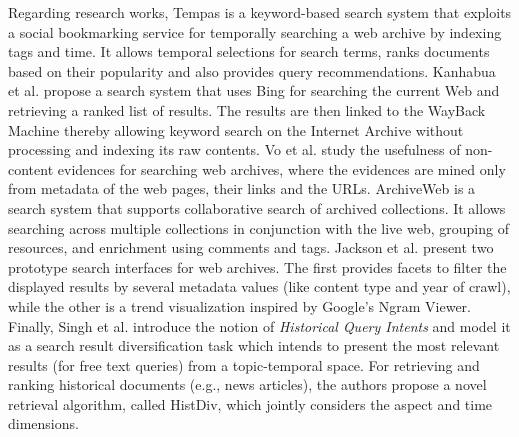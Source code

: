 \documentclass{libtex/sig-alternate-05-2015}
\begin{document}

Regarding research works,
Tempas \cite{holzmann2016tempas}
is a keyword-based search system that exploits a social bookmarking service for
temporally searching a web archive by indexing tags and time.
It allows temporal selections
for search terms, ranks documents based on their
popularity and also provides query recommendations.
%
Kanhabua et al. \cite{kanhabua2016search}
propose a search system that uses Bing for searching the current Web
and retrieving a ranked list of results.
The results are then linked to the WayBack Machine
thereby allowing keyword search on the Internet Archive without processing
and indexing its raw contents.
%
Vo et al. \cite{vo2016can}
study the usefulness of non-content evidences
for searching web archives,
where the evidences are mined only from metadata of the web pages,
their links and the URLs.
%
ArchiveWeb \cite{fernando2016archiveweb}
is a search system that supports collaborative search
of archived collections.
It allows searching across multiple collections
in conjunction with the live web,
grouping of resources,
and enrichment using comments and tags.
%
Jackson et al.\cite{jackson2016desiderata} present two prototype
search interfaces for web archives.
The first provides facets to filter the displayed results by several metadata values
(like content type and year of crawl), while
the other is a trend visualization inspired by Google's Ngram Viewer.
%
Finally, Singh et al.\cite{singh2016history}
introduce the notion of {\em Historical Query Intents}
and model it as a search result diversification task
which intends to present the most relevant results (for free text queries) from a
topic-temporal space.
For retrieving and ranking historical documents (e.g., news articles),
the authors propose a novel retrieval algorithm, called HistDiv,
which jointly considers the aspect and time dimensions.
\end{document}
